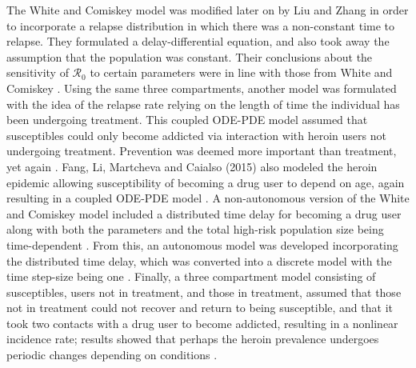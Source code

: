 \documentclass[12pt]{article}
\begin{document}
The White and Comiskey model was modified later on by Liu and Zhang in order to incorporate a relapse distribution in which there was a non-constant time to relapse. They formulated a delay-differential equation, and also took away the assumption that the population was constant. Their conclusions about the sensitivity of $\mathscr{R}_0$ to certain parameters were in line with those from White and Comiskey \cite{Liu}. Using the same three compartments, another model was formulated with the idea of the relapse rate relying on the length of time the individual has been undergoing treatment. This coupled ODE-PDE model assumed that susceptibles could only become addicted via interaction with heroin users not undergoing treatment. Prevention was deemed more important than treatment, yet again \cite{Fang1}. Fang, Li, Martcheva and Caialso (2015) also modeled the heroin epidemic allowing susceptibility of becoming a drug user to depend on age, again resulting in a coupled ODE-PDE model \cite{Fang2}. A non-autonomous version of the White and Comiskey model included a distributed time delay for becoming a drug user along with both the parameters and the total high-risk population size being time-dependent \cite{Samanta}. From this, an autonomous model was developed incorporating the distributed time delay, which was converted into a discrete model with the time step-size being one \cite{Abdurahman}. Finally, a three compartment model consisting of susceptibles, users not in treatment, and those in treatment, assumed that those not in treatment could not recover and return to being susceptible, and that it took two contacts with a drug user to become addicted, resulting in a nonlinear incidence rate; results showed that perhaps the heroin prevalence undergoes periodic changes depending on conditions \cite{Ma}. 
\end{document}
